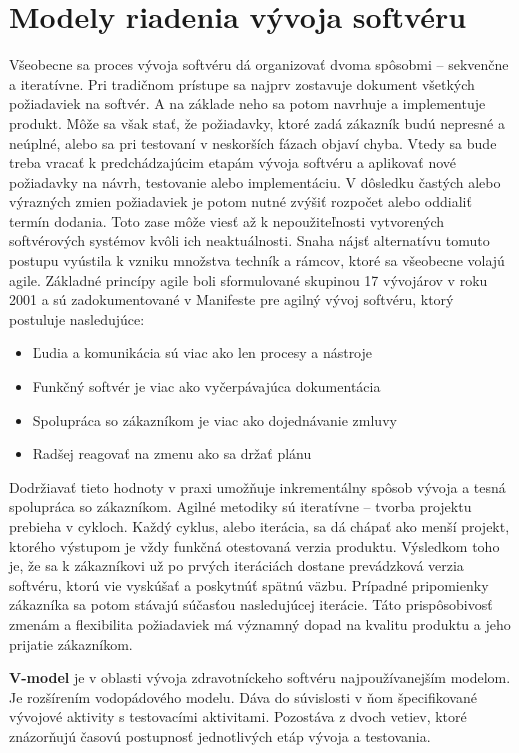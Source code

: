 \documentclass[10pt,twoside,slovak,a4paper]{article}
\begin{document}
\section{Modely riadenia vývoja softvéru}
Všeobecne sa proces vývoja softvéru dá organizovať dvoma spôsobmi – sekvenčne a iteratívne. Pri tradičnom prístupe sa najprv zostavuje dokument všetkých požiadaviek na softvér. A na základe neho sa potom navrhuje a implementuje produkt. Môže sa však stať, že požiadavky, ktoré zadá zákazník budú nepresné a neúplné, alebo sa pri testovaní v neskorších fázach objaví chyba. Vtedy sa bude treba vracať k predchádzajúcim etapám vývoja softvéru a aplikovať nové požiadavky na návrh, testovanie alebo implementáciu. V dôsledku častých alebo výrazných zmien požiadaviek je potom nutné zvýšiť rozpočet alebo oddialiť termín dodania. Toto zase môže viesť až k nepoužiteľnosti vytvorených softvérových systémov kvôli ich neaktuálnosti\cite{AVmodelPrax}. Snaha nájsť alternatívu tomuto postupu vyústila k vzniku množstva techník a rámcov, ktoré sa všeobecne volajú agile. Základné princípy agile boli sformulované skupinou 17 vývojárov v roku 2001 a sú zadokumentované v Manifeste pre agilný vývoj softvéru, ktorý postuluje nasledujúce\cite{agileManifesto}: 
\begin{itemize}
\item Ľudia a komunikácia sú viac ako len procesy a nástroje
\item Funkčný softvér je viac ako vyčerpávajúca dokumentácia
\item Spolupráca so zákazníkom je viac ako dojednávanie zmluvy
\item Radšej reagovať na zmenu ako sa držať plánu
\end{itemize}
Dodržiavať tieto hodnoty v praxi umožňuje inkrementálny spôsob vývoja a tesná spolupráca so zákazníkom. Agilné metodiky sú iteratívne – tvorba projektu prebieha v cykloch. Každý cyklus, alebo iterácia, sa dá chápať ako menší projekt, ktorého výstupom je vždy funkčná otestovaná verzia produktu. Výsledkom toho je, že sa k zákazníkovi už po prvých iteráciách dostane prevádzková verzia softvéru, ktorú vie vyskúšať a poskytnúť spätnú väzbu. Prípadné pripomienky zákazníka sa potom stávajú súčasťou nasledujúcej iterácie. Táto prispôsobivosť zmenám a flexibilita požiadaviek má významný dopad na kvalitu produktu a jeho prijatie zákazníkom\cite{agileManifesto}. 

\textbf{V-model} je v oblasti vývoja zdravotníckeho softvéru najpoužívanejším modelom. Je rozšírením vodopádového modelu. Dáva do súvislosti v ňom špecifikované vývojové aktivity s testovacími aktivitami. Pozostáva z dvoch vetiev, ktoré znázorňujú časovú postupnosť jednotlivých etáp vývoja a testovania\cite{mchugh2013}.
\end{document}
